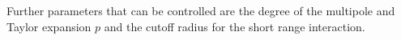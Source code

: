 Further parameters that can be controlled are the degree of the multipole and Taylor expansion $p$ and the cutoff radius for the short range interaction.

